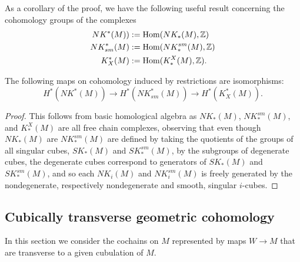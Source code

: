 As a corollary of the proof, we have the following useful result concerning the cohomology groups of the complexes
\begin{align*}
NK^*(M))&:=\textup{Hom}(NK_*(M),\mathbb{Z})\\
NK_{sm}^*(M)&:=\textup{Hom}(NK^{sm}_*(M),\mathbb{Z})\\
K^*_X(M)&:=\textup{Hom}(K^X_*(M),\mathbb{Z}).
\end{align*}



\begin{corollary}
The following maps on cohomology induced by restrictions  are isomorphisms: $$H^*(NK^*(M))\to H^*(NK_{sm}^*(M))\to H^*(K^*_X(M)).$$
\end{corollary}
\begin{proof}
This follows from basic homological algebra \cite[Theorem 45.5]{Mun84} as $NK_*(M)$, $NK^{sm}_*(M)$, and $K^X_*(M)$ are all free chain complexes, observing that even though $NK_*(M)$ are $NK^{sm}_*(M)$ are defined by taking the quotients of the groups of all singular cubes, $SK_*(M)$ and $SK^{sm}_*(M)$, by the subgroups of degenerate cubes, the degenerate cubes correspond to generators of $SK_*(M)$ and $SK^{sm}_*(M)$, and so each $NK_i(M)$ and $NK^{sm}_i(M)$ is freely generated by the nondegenerate, respectively nondegenerate and smooth, singular $i$-cubes.
\end{proof}



\subsection{Cubically transverse geometric cohomology}\label{S: transverse cochains}


In this section we consider the cochains on $M$ represented by maps $W\to M$ that are transverse to a given cubulation of $M$.

